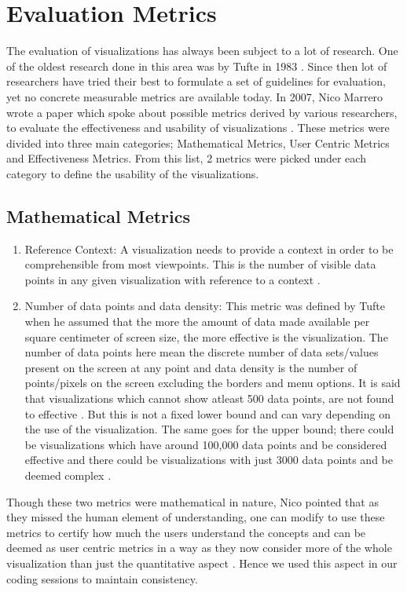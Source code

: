 \documentclass[double,12pt]{beavtex}
\begin{document}
\section{Evaluation Metrics}
The evaluation of visualizations has always been subject to a lot of research. One of the oldest research done in this area was by Tufte in 1983 \cite{tufte1983}. Since then lot of researchers have tried their best to formulate a set of guidelines for evaluation, yet no concrete measurable metrics are available today. In 2007, Nico Marrero wrote a paper which spoke about possible metrics derived by various researchers, to evaluate the effectiveness and usability of visualizations \cite{nico2007}. These metrics were divided into three main categories; Mathematical Metrics, User Centric Metrics and Effectiveness Metrics. From this list, 2 metrics were picked under each category to define the usability of the visualizations.

\subsection{Mathematical Metrics}

\begin{enumerate}
\item Reference Context: A visualization needs to provide a context in order to be comprehensible from most viewpoints. This is the number of visible data points in any given visualization with reference to a context \cite{brath1997}.

\item Number of data points and data density: This metric was defined by Tufte when he assumed that the more the amount of data made available per square centimeter of screen size, the more effective is the visualization. The number of data points here mean the discrete number of data sets/values present on the screen at any point and data density is the number of points/pixels on the screen excluding the borders and menu options. It is said that visualizations which cannot show atleast 500 data points, are not found to effective \cite{brath1997}. But this is not a fixed lower bound and can vary depending on the use of the visualization. The same goes for the upper bound; there could be visualizations which have around 100,000 data points and be considered effective and there could be visualizations with just 3000 data points and be deemed complex \cite{brath1997}.
\end{enumerate}

Though these two metrics were mathematical in nature, Nico pointed that as they missed the human element of understanding, one can modify to use these metrics to certify how much the users understand the concepts and can be deemed as user centric metrics in a way as they now consider more of the whole visualization than just the quantitative aspect \cite{nico2007, brath1997}. Hence we used this aspect in our coding sessions to maintain consistency.
\end{document}
